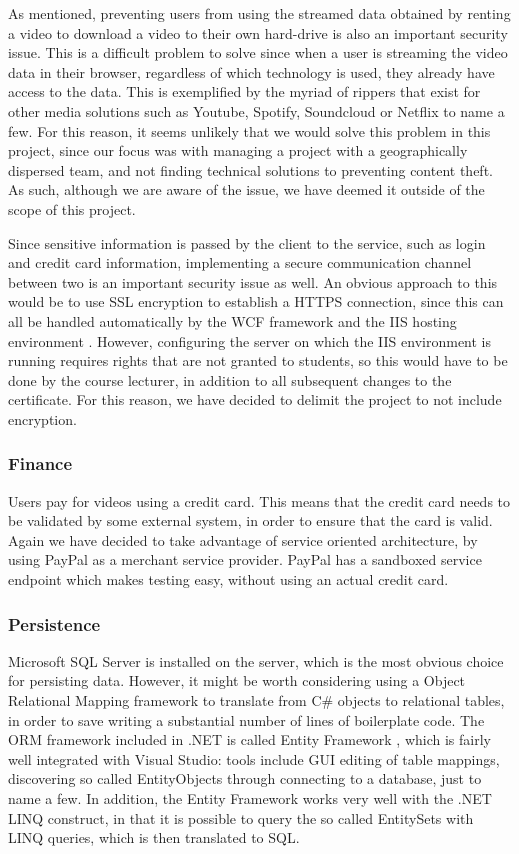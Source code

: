 As mentioned, preventing users from using the streamed data obtained by renting a video to download a video to their own hard-drive is also an important security issue. This is a difficult problem to solve since when a user is streaming the video data in their browser, regardless of which technology is used, they already have access to the data. This is exemplified by the myriad of rippers that exist for other media solutions such as Youtube, Spotify, Soundcloud or Netflix to name a few. For this reason, it seems unlikely that we would solve this problem in this project, since our focus was with managing a project with a geographically dispersed team, and not finding technical solutions to preventing content theft. As such, although we are aware of the issue, we have deemed it outside of the scope of this project.

Since sensitive information is passed by the client to the service, such as login and credit card information, implementing a secure communication channel between two is an important security issue as well. An obvious approach to this would be to use SSL encryption to establish a HTTPS connection, since this can all be handled automatically by the WCF framework and the IIS hosting environment\cite[chapter.~7
]{MLB} \cite{MSDN}. However, configuring the server on which  the IIS environment is running requires rights that are not granted to students, so this would have to be done by the course lecturer, in addition to all subsequent changes to the certificate. For this reason, we have decided to delimit the project to not include encryption.

\subsubsection{Finance} \label{Paypal}
Users pay for videos using a credit card. This means that the credit card needs to be validated by some external system, in order to ensure that the card is valid. Again we have decided to take advantage of service oriented architecture, by using PayPal as a merchant service provider. PayPal has a sandboxed service endpoint which makes testing easy, without using an actual credit card\cite{PP}.

\subsubsection{Persistence}
Microsoft SQL Server is installed on the server, which is the most obvious choice for persisting data. However, it might be worth considering using a Object Relational Mapping framework to translate from C\# objects to relational tables, in order to save writing a substantial number of lines of boilerplate code. The ORM framework included in .NET is called Entity Framework \cite[p.~548]{CSHARP}, which is fairly well integrated with Visual Studio: tools include GUI editing of table mappings, discovering so called EntityObjects through connecting to a database, just to name a few. In addition, the Entity Framework works very well with the .NET LINQ construct, in that it is possible to query the so called EntitySets with LINQ queries, which is then translated to SQL.

